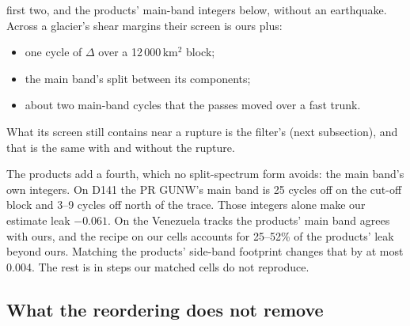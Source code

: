 first two, and the products' main-band integers below, without an earthquake. Across a glacier's shear margins their
screen is ours plus:
\begin{itemize}
  \item one cycle of $\Delta$ over a 12\,000\,km$^2$ block;
  \item the main band's split between its components;
  \item about two main-band cycles that the passes moved over a fast trunk.
\end{itemize} What its screen still contains near a rupture is the
filter's (next subsection), and that is the same with and without the rupture.

The products add a fourth, which no split-spectrum form avoids: the main band's own integers. On D141 the PR GUNW's
main band is 25 cycles off on the cut-off block and 3--9 cycles off north of the trace. Those integers alone make our
estimate leak $-0.061$. On the Venezuela tracks the products' main band agrees with ours, and the recipe on our cells
accounts for 25--52\% of the products' leak beyond ours. Matching the products' side-band footprint changes that by
at most 0.004. The rest is in steps our matched cells do not reproduce.

\subsection{What the reordering does not remove}
\label{sec:tie}

